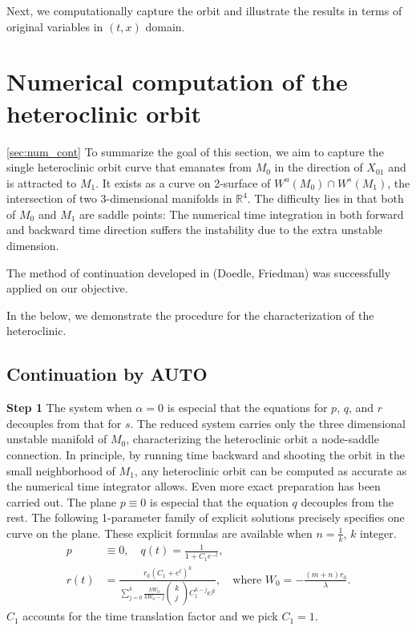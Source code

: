 \documentclass[a4paper,11pt]{article}
\theoremstyle{remark}
\begin{document}
Next, we computationally capture the orbit and illustrate the results in terms of original variables in $(t,x)$ domain.

\section{Numerical computation of the heteroclinic orbit} \ref{sec:num_cont}
To summarize the goal of this section, we aim to capture the single heteroclinic orbit curve that emanates from $M_0$ in the direction of $X_{01}$ and is attracted to $M_1$. It exists as a curve on 2-surface of $W^u(M_0)\cap W^s(M_1)$, the intersection of two 3-dimensional manifolds in $\mathbb{R}^4$. The difficulty lies in that both of $M_0$ and $M_1$ are saddle points: The numerical time integration in both forward and backward time direction suffers the instability due to the extra unstable dimension.

The method of continuation developed in {(Doedle, Friedman)} was successfully applied on our objective.

In the below, we demonstrate the procedure for the characterization of the heteroclinic.
\subsection{Continuation by AUTO}
{\bf \noindent Step 1}
The system when $\alpha=0$ is especial that the equations for $p$, $q$, and $r$ decouples from that for $s$. The reduced system carries only the three dimensional unstable manifold of $M_0$, characterizing the heteroclinic orbit a node-saddle connection. In principle, by running time backward and shooting the orbit in the small neighborhood of $M_1$, any heteroclinic orbit can be computed as accurate as the numerical time integrator allows. Even more exact preparation has been carried out. The plane $p\equiv0$ is especial that the equation $q$ decouples from the rest. The following 1-parameter family of explicit solutions precisely specifies one curve on the plane. These explicit formulas are available when $n= \frac{1}{k}$, $k$ integer.
\begin{align}
 p&\equiv0, \quad q(t) = \frac{1}{1+C_1e^{-t}},\\
 r(t) &= \frac{r_0 \left(C_1 + e^t\right)^k}{ \displaystyle \sum_{j=0}^k \frac{kW_0}{kW_0 -j}\begin{pmatrix} k\\j\end{pmatrix}C_1^{k-j} e^{jt}} , \quad \text{where $W_0= - \frac{(m+n)r_0}{\lambda}$}.
\end{align}
$C_1$ accounts for the time translation factor and we pick $C_1=1$.
\end{document}

